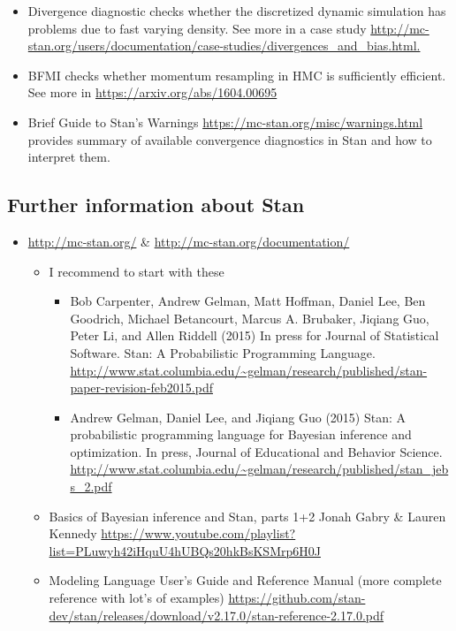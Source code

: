 \documentclass[a4paper,11pt,english]{article}
\begin{document}
\begin{itemize}
\item Divergence diagnostic checks whether the discretized dynamic
simulation has problems due to fast varying density. See more in a
case study
\url{http://mc-stan.org/users/documentation/case-studies/divergences_and_bias.html.}
\item BFMI checks whether momentum resampling in HMC is sufficiently efficient. See more in
\url{https://arxiv.org/abs/1604.00695}
\item Brief Guide to Stan's Warnings
\url{https://mc-stan.org/misc/warnings.html} provides summary of
available convergence diagnostics in Stan and how to interpret them.
\end{itemize}

\subsection*{Further information about Stan}

\begin{itemize}
\item \url{http://mc-stan.org/} \& \url{http://mc-stan.org/documentation/}
  \begin{itemize}
  \item I recommend to start with these
    \begin{itemize}
    \item Bob Carpenter, Andrew Gelman, Matt Hoffman, Daniel Lee, Ben
      Goodrich, Michael Betancourt, Marcus A. Brubaker, Jiqiang Guo,
      Peter Li, and Allen Riddell (2015) In press for Journal of
      Statistical Software. Stan: A Probabilistic Programming
      Language. \url{http://www.stat.columbia.edu/~gelman/research/published/stan-paper-revision-feb2015.pdf}
    \item Andrew Gelman, Daniel Lee, and Jiqiang Guo (2015) Stan: A
      probabilistic programming language for Bayesian inference and
      optimization. In press, Journal of Educational and Behavior
      Science. \url{http://www.stat.columbia.edu/~gelman/research/published/stan_jebs_2.pdf}
    \end{itemize}
  \item Basics of Bayesian inference and Stan, parts 1+2 Jonah Gabry \& Lauren Kennedy \url{https://www.youtube.com/playlist?list=PLuwyh42iHquU4hUBQs20hkBsKSMrp6H0J}
  \item Modeling Language User's Guide and Reference Manual (more complete reference with lot's of examples) \url{https://github.com/stan-dev/stan/releases/download/v2.17.0/stan-reference-2.17.0.pdf}
  \end{itemize}
\end{itemize}
\end{document}

